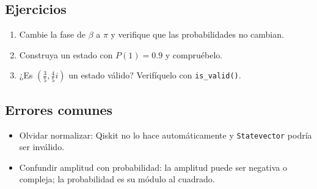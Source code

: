 \subsection{Ejercicios}
\begin{enumerate}
  \item Cambie la fase de $\beta$ a $\pi$ y verifique que las probabilidades no
    cambian.
  \item Construya un estado con $P(1)=0.9$ y compruébelo.
  \item ¿Es $(\tfrac35,\tfrac45 i)$ un estado válido? Verifíquelo con
    \texttt{is\_valid()}.
\end{enumerate}

\subsection{Errores comunes}
\begin{itemize}
  \item Olvidar normalizar: Qiskit no lo hace automáticamente y
    \texttt{Statevector} podría ser inválido.
  \item Confundir amplitud con probabilidad: la amplitud puede ser negativa o
    compleja; la probabilidad es su módulo al cuadrado.
\end{itemize}


